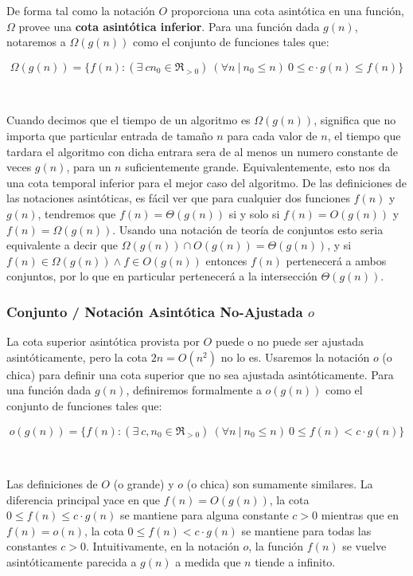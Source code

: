 \documentclass[10pt, a4paper]{report}
\begin{document}
De forma tal como la notaci\'on $O$ proporciona una cota asint\'otica en una funci\'on, $\Omega$ provee una \textbf{cota asint\'otica inferior}. Para una funci\'on dada $g(n)$, notaremos a $\Omega(g(n))$ como el conjunto de funciones tales que:

\begin{equation*}
 \Omega(g(n)) = \{ f(n) : (\exists\ c n_0 \in \Re_{>0}) \ (\forall n\ |\ n_0 \leq n)\ 0 \leq c \cdot g(n) \leq f(n) \}
\end{equation*}

~

Cuando decimos que el tiempo de un algoritmo es $\Omega(g(n))$, significa que no importa que particular entrada de tama\~no $n$ para cada valor de $n$, el tiempo que tardara el algoritmo con dicha entrara sera de al menos un numero constante de veces $g(n)$, para un $n$ suficientemente grande. Equivalentemente, esto nos da una cota temporal inferior para el mejor caso del algoritmo. De las definiciones de las notaciones asint\'oticas, es f\'acil ver que para cualquier dos funciones $f(n)$ y $g(n)$, tendremos que $f(n) = \Theta(g(n))$ si y solo si $f(n) = O(g(n))$ y $f(n) = \Omega(g(n))$. Usando una notaci\'on de teor\'ia de conjuntos esto seria equivalente a decir que $\Omega(g(n)) \cap O(g(n)) = \Theta(g(n))$, y si $f(n) \in \Omega(g(n)) \land f \in O(g(n))$ entonces $f(n)$ pertenecer\'a a ambos conjuntos, por lo que en particular pertenecer\'a a la intersecci\'on $\Theta(g(n))$.

\subsubsection{Conjunto / Notaci\'on Asint\'otica No-Ajustada $o$}

La cota superior asint\'otica provista por $O$ puede o no puede ser ajustada asint\'oticamente, pero la cota $2n = O(n^2)$ no lo es. Usaremos la notaci\'on $o$ (o chica) para definir una cota superior que no sea ajustada asint\'oticamente. Para una funci\'on dada $g(n)$, definiremos formalmente a $o(g(n))$ como el conjunto de funciones tales que:

\begin{equation*}
 o(g(n)) = \{ f(n) : (\exists\ c, n_0 \in \Re_{>0}) \ (\forall n\ |\ n_0 \leq n)\ 0 \leq f(n) < c \cdot g(n) \}
\end{equation*}

~

Las definiciones de $O$ (o grande) y $o$ (o chica) son sumamente similares. La diferencia principal yace en que $f(n) = O(g(n))$, la cota $0 \leq f(n) \leq c \cdot g(n)$ se mantiene para alguna constante $c > 0$ mientras que en $f(n) = o(n)$, la cota $0 \leq f(n) < c \cdot g(n)$ se mantiene para todas las constantes $c > 0$. Intuitivamente, en la notaci\'on $o$, la funci\'on $f(n)$ se vuelve asint\'oticamente parecida a $g(n)$ a medida que $n$ tiende a infinito.
\end{document}
